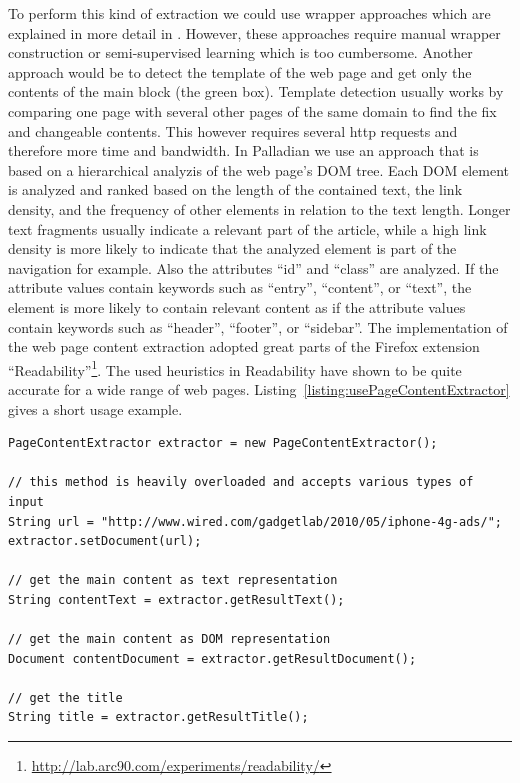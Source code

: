 \documentclass[a4paper,twoside]{book}      %
\begin{document}
To perform this kind of extraction we could use wrapper approaches which are explained in more detail in \cite{ckgs2006}. However, these approaches require manual wrapper construction or semi-supervised learning which is too cumbersome.
Another approach would be to detect the template of the web page and get only the contents of the main block (the green box). Template detection usually works by comparing one page with several other pages of the same domain to find the fix and changeable contents. This however requires several http requests and therefore more time and bandwidth.
In Palladian we use an approach that is based on a hierarchical analyzis of the web page's DOM tree. Each DOM element is analyzed and ranked based on the length of the contained text, the link density, and the frequency of other elements in relation to the text length. Longer text fragments usually indicate a relevant part of the article, while a high link density is more likely to indicate that the analyzed element is part of the navigation for example. Also the attributes ``id'' and ``class'' are analyzed. If the attribute values contain keywords such as ``entry'', ``content'', or ``text'', the element is more likely to contain relevant content as if the attribute values contain keywords such as ``header'', ``footer'', or ``sidebar''. The implementation of the web page content extraction adopted great parts of the Firefox extension ``Readability''\footnote{\url{http://lab.arc90.com/experiments/readability/}}. The used heuristics in Readability have shown to be quite accurate for a wide range of web pages. Listing~\ref{listing:usePageContentExtractor} gives a short usage example.

\begin{codelisting}
\label{listing:usePageContentExtractor}
\begin{lstlisting}[frame=tb]
PageContentExtractor extractor = new PageContentExtractor();

// this method is heavily overloaded and accepts various types of input
String url = "http://www.wired.com/gadgetlab/2010/05/iphone-4g-ads/";
extractor.setDocument(url);

// get the main content as text representation
String contentText = extractor.getResultText();

// get the main content as DOM representation
Document contentDocument = extractor.getResultDocument();

// get the title
String title = extractor.getResultTitle();
\end{lstlisting}
\end{codelisting}
\end{document}
